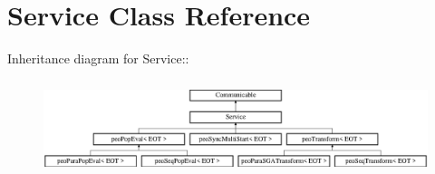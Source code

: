 \section{Service Class Reference}
\label{class_service}
Inheritance diagram for Service::\begin{figure}[H]
\begin{center}
\leavevmode
\includegraphics[height=2.8cm]{class_service}
\end{center}
\end{figure}
